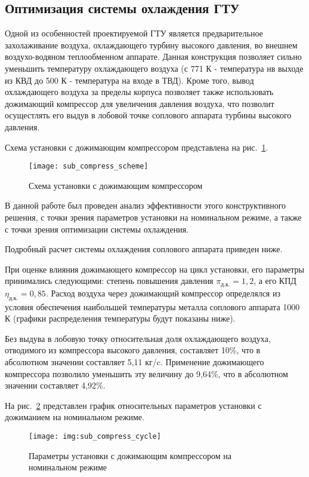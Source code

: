 \subsection{Оптимизация системы охлаждения ГТУ}
Одной из особенностей проектируемой ГТУ является предварительное захолаживание воздуха, охлаждающего турбину высокого давления, во внешнем воздухо-водяном теплообменном аппарате. Данная конструкция позволяет сильно уменьшить температуру охлаждающего воздуха (с 771 К - температура нв выходе из КВД до 500 К - температура на входе в ТВД). Кроме того, вывод охлаждающего воздуха за пределы корпуса позволяет также использовать дожимающий компрессор для увеличения давления воздуха, что позволит осущестлять его выдув в лобовой точке соплового аппарата турбины высокого давления.

Схема установки с дожимающим компрессором представлена на рис.~\ref{img:sub_compress_scheme}.

\begin{figure}[H]
    \centering
    \texttt{[image: sub\_compress\_scheme]}
    \caption{Схема установки с дожимающим компрессором}
	\label{img:sub_compress_scheme}
\end{figure}

В данной работе был проведен анализ эффективности этого конструктивного решения, с точки зрения параметров установки на номинальном режиме, а также с точки зрения оптимизации системы охлаждения. 

Подробный расчет системы охлаждения соплового аппарата приведен ниже.

При оценке влияния дожимающего компрессор на цикл установки, его параметры принимались следующими: степень повышения давления $\pi_{д.к.} = 1,2$, а его КПД $\eta_{д.к.} = 0,85$.
Расход воздуха через дожимающий компрессор определялся из условия обеспечения наибольшей температуры металла соплового аппарата 1000 К (графики распределения температуры будут показаны ниже).

Без выдува в лобовую точку относительная доля охлаждающего воздуха, отводимого из компрессора высокого давления, составляет 10\%, что в абсолютном значении составляет 5,11 кг/c. Применение дожимающего компрессора позволило уменьшить эту величину до 9,64\%, что в абсолютном значении составляет 4,92\%. 

На рис.~\ref{img:sub_compress_cycle} представлен график относительных параметров установки с дожиманием на номинальном режиме.

\begin{figure}[H]
    \centering
    \texttt{[image: img:sub\_compress\_cycle]}
    \caption{Параметры установки с дожимающим компрессором на номинальном режиме}
	\label{img:sub_compress_cycle}
\end{figure}

